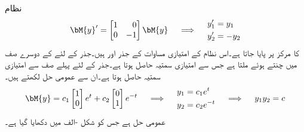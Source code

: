 نظام
\begin{gather}\label{مساوات_نظام_نقطہ_زین}
\begin{aligned}
\bM{y}'=\begin{bmatrix*}[r] 1&0 \\ 0&-1 \end{bmatrix*} \bM{y}
\end{aligned}\quad \implies \quad
\begin{aligned}
y_1'&=y_1\\ 
y_2'&=-y_2
\end{aligned}
\end{gather}
کا  مرکز پر پایا جاتا ہے۔اس نظام کے امتیازی مساوات  کے جذر  اور  ہیں۔جذر  کے لئے  کے دوسرے صف  میں  چنتے ہوئے  ملتا ہے جس سے  امتیازی سمتیہ  حاصل ہوتا ہے۔جذر  کے لئے پہلے صف سے امتیازی سمتیہ  حاصل ہوتا ہے۔ان سے عمومی حل لکھتے ہیں۔
\begin{gather}
\begin{aligned}
\bM{y}=c_1\begin{bmatrix}1 \\ 0  \end{bmatrix} e^t+c_2\begin{bmatrix}  0\\1 \end{bmatrix} e^{-t}
\end{aligned} \quad \implies\quad
\begin{aligned}
y_1&=c_1e^t\\
y_2&=c_2e^{-t}
\end{aligned}\quad \implies \quad
\begin{aligned}
y_1y_2=c
\end{aligned}
\end{gather}
عمومی حل  ہے جس کو شکل -الف میں دکھایا گیا ہے۔
